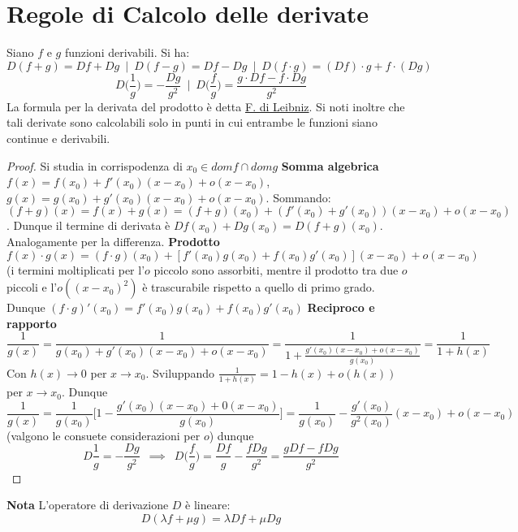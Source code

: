\documentclass[10pt, oneside]{book}
\theoremstyle{plain}
\begin{document}
\section{Regole di Calcolo delle derivate}
\begin{prop}
Siano $f$ e $g$ funzioni derivabili. Si ha:
\[D(f + g) = Df + Dg \enspace | \enspace D(f-g) = Df - Dg \enspace | \enspace D(f \cdot g) = (Df) \cdot g + f \cdot (Dg)\] \[D \bigg(\frac{1}{g}\bigg) = - \frac{Dg}{g^2} \enspace | \enspace D \bigg(\frac{f}{g}\bigg) = \frac{g \cdot Df - f \cdot Dg}{g^2}\]
La formula per la derivata del prodotto è detta \underline{F. di Leibniz}. Si noti inoltre che tali derivate sono calcolabili solo in punti in cui entrambe le funzioni siano continue e derivabili.
\end{prop}
\begin{proof}
Si studia in corrispodenza di $x_0 \in dom f \cap dom g$
\textbf{Somma algebrica} $f(x) = f(x_0) + f'(x_0) (x-x_0) + o (x - x_0)$, $g(x) = g(x_0) + g'(x_0) (x-x_0) + o (x - x_0)$. Sommando: $(f+g)(x) = f(x) + g(x) = (f+g)(x_0) + (f'(x_0) + g'(x_0)) (x-x_0) + o (x-x_0)$. Dunque il termine di derivata è $Df(x_0) + Dg(x_0) = D(f+g)(x_0)$. Analogamente per la differenza.
\textbf{Prodotto} $f(x) \cdot g(x) = (f\cdot g)(x_0) + [f'(x_0)g(x_0) + f(x_0)g'(x_0)](x-x_0) + o(x -x_0)$ (i termini moltiplicati per l'$o$ piccolo sono assorbiti, mentre il prodotto tra due $o$ piccoli e l'$o((x-x_0)^2)$ è trascurabile rispetto a quello di primo grado. Dunque $(f\cdot g)'(x_0) = f'(x_0)g(x_0) + f(x_0)g'(x_0)$
\textbf{Reciproco e rapporto} 
\[\frac{1}{g(x)} = \frac{1}{g(x_0) + g'(x_0) (x-x_0) + o(x-x_0)} = \frac{1}{1 + \frac{g'(x_0)(x -x_0) + o(x-x_0)}{g(x_0)}} = \frac{1}{1+h(x)}\]
Con $h(x) \rightarrow 0$ per $x \rightarrow x_0$. Sviluppando $\frac{1}{1+h(x)} = 1 - h(x) + o(h(x))$ per $x \rightarrow x_0$. Dunque
\[\frac{1}{g(x)} = \frac{1}{g(x_0)}\bigg[1 - \frac{g'(x_0)(x-x_0) + 0(x-x_0)}{g(x_0)} \bigg] = \frac{1}{g(x_0)} - \frac{g'(x_0)}{g^2(x_0)}(x-x_0) + o(x-x_0)\]
(valgono le consuete considerazioni per $o$) dunque
\[D\frac{1}{g} = -\frac{Dg}{g^2} \enspace \implies \enspace D\bigg(\frac{f}{g}\bigg) = \frac{Df}{g} - \frac{fDg}{g^2} = \frac{gDf - f Dg}{g^2}\]
\end{proof}

\textbf{Nota} L'operatore di derivazione $D$ è lineare:
\[D ( \lambda f + \mu g) = \lambda D f + \mu D g\]
\end{document}
